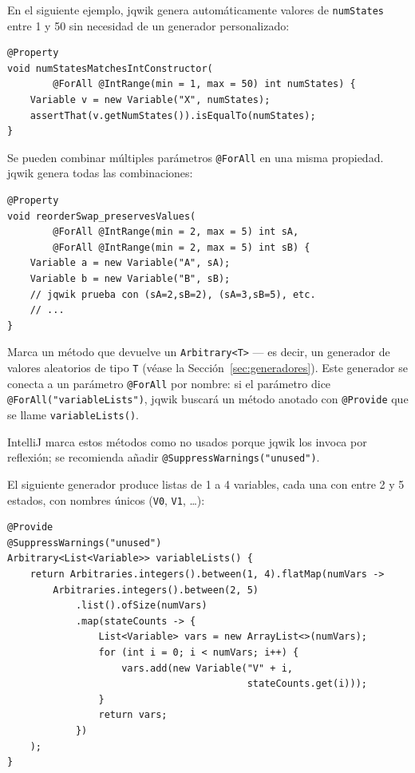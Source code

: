\documentclass[12pt,a4paper]{article}
\begin{document}
\begin{description}[leftmargin=2em, style=nextline]
    En el siguiente ejemplo, jqwik genera automáticamente valores de
    \texttt{numStates} entre 1 y 50 sin necesidad de un generador
    personalizado:

\begin{lstlisting}[caption={\texttt{@ForAll} con tipos primitivos y restricciones}, label={lst:forall}]
@Property
void numStatesMatchesIntConstructor(
        @ForAll @IntRange(min = 1, max = 50) int numStates) {
    Variable v = new Variable("X", numStates);
    assertThat(v.getNumStates()).isEqualTo(numStates);
}
\end{lstlisting}

    Se pueden combinar múltiples parámetros \texttt{@ForAll} en una misma
    propiedad. jqwik genera todas las combinaciones:

\begin{lstlisting}[caption={\texttt{@ForAll} con múltiples parámetros}, label={lst:forall-multi}]
@Property
void reorderSwap_preservesValues(
        @ForAll @IntRange(min = 2, max = 5) int sA,
        @ForAll @IntRange(min = 2, max = 5) int sB) {
    Variable a = new Variable("A", sA);
    Variable b = new Variable("B", sB);
    // jqwik prueba con (sA=2,sB=2), (sA=3,sB=5), etc.
    // ...
}
\end{lstlisting}

  \item[\texttt{@Provide}]
    Marca un método que devuelve un \texttt{Arbitrary<T>} --- es decir,
    un generador de valores aleatorios de tipo \texttt{T} (véase la
    Sección~\ref{sec:generadores}). Este generador se conecta a un
    parámetro \texttt{@ForAll} por nombre: si el parámetro dice
    \texttt{@ForAll("variableLists")}, jqwik buscará un método anotado
    con \texttt{@Provide} que se llame \texttt{variableLists()}.

    IntelliJ marca estos métodos como no usados porque jqwik los invoca
    por reflexión; se recomienda añadir \texttt{@SuppressWarnings("unused")}.

    El siguiente generador produce listas de 1 a 4 variables, cada una con
    entre 2 y 5 estados, con nombres únicos (\texttt{V0}, \texttt{V1}, \ldots):

\begin{lstlisting}[caption={\texttt{@Provide}: generador de listas de variables}, label={lst:provide}]
@Provide
@SuppressWarnings("unused")
Arbitrary<List<Variable>> variableLists() {
    return Arbitraries.integers().between(1, 4).flatMap(numVars ->
        Arbitraries.integers().between(2, 5)
            .list().ofSize(numVars)
            .map(stateCounts -> {
                List<Variable> vars = new ArrayList<>(numVars);
                for (int i = 0; i < numVars; i++) {
                    vars.add(new Variable("V" + i,
                                          stateCounts.get(i)));
                }
                return vars;
            })
    );
}
\end{lstlisting}


\end{description}
\end{document}
